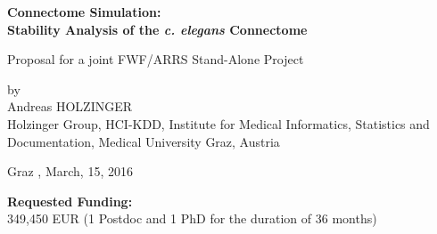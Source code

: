 \documentclass[a4paper,11pt]{article}
\begin{document}
\begin{titlepage}
\begin{center}
\bfseries\Large
Connectome Simulation:\\
Stability Analysis of the \emph{c. elegans} Connectome
\\[0,6cm]
\normalfont\normalsize

Proposal for a joint FWF/ARRS Stand-Alone Project 

by\\
Andreas HOLZINGER\\

Holzinger Group, HCI-KDD, Institute for Medical Informatics, Statistics and Documentation,
Medical University Graz, Austria
\\[0,4cm]
\vspace{0.7\baselineskip}
\begin{figure}[ht]
  \centering
\end{figure}
%
Graz , March, 15, 2016 
%
\end{center}
\vspace{0.5\baselineskip}
\end{titlepage}
%
%
{\bf Requested Funding:}\\ 349,450 EUR (1 Postdoc and 1 PhD for the duration of 36 months) 
\end{document}
